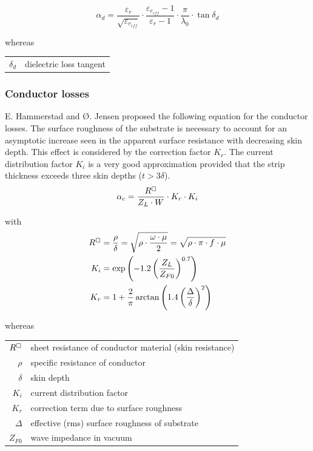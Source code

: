 \documentclass[10pt]{report}
\begin{document}
\begin{equation}
\alpha_d = \dfrac{\varepsilon_r}{\sqrt{\varepsilon_{r_{eff}}}}\cdot \dfrac{\varepsilon_{r_{eff}} - 1}{\varepsilon_r - 1}\cdot \dfrac{\pi}{\lambda_0}\cdot \tan{\delta_d}
\end{equation}

whereas

\addvspace{12pt}

\begin{tabular}{rl}
$\delta_d$& dielectric loss tangent
\end{tabular}

\subsubsection{Conductor losses}

E. Hammerstad and {\O}. Jensen \cite{Hammerstad} proposed the following
equation for the conductor losses.  The surface roughness of the
substrate is necessary to account for an asymptotic increase seen in
the apparent surface resistance with decreasing skin depth.  This
effect is considered by the correction factor $K_r$.  The current
distribution factor $K_i$ is a very good approximation provided that
the strip thickness exceeds three skin depths ($t > 3\delta$).
\begin{equation}
\alpha_c = \dfrac{R^{\boxempty}}{Z_L \cdot W}\cdot K_r \cdot K_i
\end{equation}

with
\begin{align}
R^{\boxempty} &= \dfrac{\rho}{\delta} = \sqrt{\rho\cdot\dfrac{\omega \cdot \mu}{2}} = \sqrt{\rho\cdot\pi\cdot f \cdot \mu}\\
\label{eq:HandJKi}
K_i &= \exp{\left(-1.2\left(\dfrac{Z_L}{Z_{F0}}\right)^{0.7}\right)}\\
K_r &= 1 + \dfrac{2}{\pi}\arctan{\left(1.4\left(\dfrac{\Delta}{\delta}\right)^2\right)}
\end{align}

whereas

\addvspace{12pt}

\begin{tabular}{rl}
$R^{\boxempty}$& sheet resistance of conductor material (skin resistance)\\
$\rho$& specific resistance of conductor\\
$\delta$& skin depth\\
$K_i$& current distribution factor\\
$K_r$& correction term due to surface roughness\\
$\Delta$& effective (rms) surface roughness of substrate\\
$Z_{F0}$& wave impedance in vacuum
\end{tabular}
\end{document}
